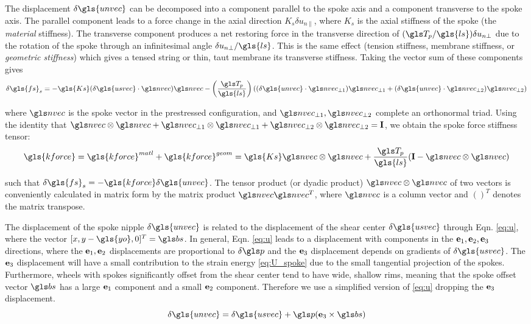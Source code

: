 \documentclass[\rootdir/thesis.tex]{subfiles}
\begin{document}
The displacement $\delta\gls{unvec}$ can be decomposed into a component parallel to the spoke axis and a component transverse to the spoke axis. The parallel component leads to a force change in the axial direction $K_s \delta u_{n\parallel}$, where $K_s$ is the axial stiffness of the spoke (the \emph{material} stiffness). The transverse component produces a net restoring force in the transverse direction of $(\T_p/\gls{ls}) \delta u_{n\perp}$ due to the rotation of the spoke through an infinitesimal angle $\delta u_{n\perp}/\gls{ls}$. This is the same effect (tension stiffness, membrane stiffness, or \emph{geometric stiffness}) which gives a tensed string or thin, taut membrane its transverse stiffness. Taking the vector sum of these components gives
\begin{equation}
\label{eq:fs_us}
\delta\gls{fs}_s =
    -\gls{Ks} (\delta\gls{usvec} \cdot \n)\n -
    \left(\frac{\T_p}{\gls{ls}}\right) \left((\delta\gls{unvec} \cdot \npo) \npo +
                                             (\delta\gls{unvec} \cdot \npt) \npt \right)
\end{equation}

where $\n$ is the spoke vector in the prestressed configuration, and $\npo,\npt$ complete an orthonormal triad. Using the identity that $\n\otimes\n + \npo\otimes\npo + \npt\otimes\npt = \mathbf{I}$, we obtain the spoke force stiffness tensor:
\begin{equation}
\label{eq:kf}
\gls{kforce} = \matl{\gls{kforce}} + \geom{\gls{kforce}} = \gls{Ks} \n\otimes\n + \frac{\T_p}{\gls{ls}}(\mathbf{I} - \n\otimes\n)
\end{equation}

such that $\delta\gls{fs}_s=-\gls{kforce} \delta\gls{unvec}$. The tensor product (or dyadic product) $\n\otimes\n$ of two vectors is conveniently calculated in matrix form by the matrix product $\n\n^T$, where $\n$ is a column vector  and $()^T$ denotes the matrix transpose.

The displacement of the spoke nipple $\delta\gls{unvec}$ is related to the displacement of the shear center $\delta\gls{usvec}$ through Eqn. \eqref{eq:u}, where the vector $[\x,\y-\gls{yo},0]^T = \bs$. In general, Eqn. \eqref{eq:u} leads to a displacement with components in the $\mathbf{e}_1,\mathbf{e}_2,\mathbf{e}_3$ directions, where the $\mathbf{e}_1,\mathbf{e}_2$ displacements are proportional to $\delta\p$ and the $\mathbf{e}_3$ displacement depends on gradients of $\delta\gls{usvec}$. The $\mathbf{e}_3$ displacement will have a small contribution to the strain energy \eqref{eq:U_spoke} due to the small tangential projection of the spokes. Furthermore, wheels with spokes significantly offset from the shear center tend to have wide, shallow rims, meaning that the spoke offset vector $\bs$ has a large $\mathbf{e}_1$ component and a small $\mathbf{e}_2$ component. Therefore we use a simplified version of \eqref{eq:u} dropping the $\mathbf{e}_3$ displacement.
\begin{equation}
\label{eq:un_us}
\delta\gls{unvec} = \delta\gls{usvec} + \p (\eh \times \bs)
\end{equation}
\end{document}

